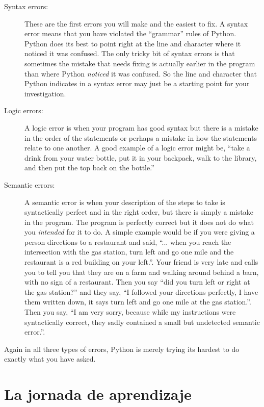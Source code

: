 \begin{description}

\item[Syntax errors:] These are the first errors you will make and the easiest
to fix.  A syntax error means that you have violated the ``grammar'' rules of Python.
Python does its best to point right at the line and character where 
it noticed it was confused.  The only tricky bit of syntax errors is that sometimes
the mistake that needs fixing is actually earlier in the program than where Python
{\em noticed} it was confused.  So the line and character that Python indicates in 
a syntax error may just be a starting point for your investigation.

\item[Logic errors:] A logic error is when your program has good syntax but there is a mistake 
in the order of the statements or perhaps a mistake in how the statements relate to one another.
A good example of a logic error might be, ``take a drink from your water bottle, put it 
in your backpack, walk to the library, and then put the top back on the bottle.''

\item[Semantic errors:] A semantic error is when your description of the steps to take 
is syntactically perfect and in the right order, but there is simply a mistake in 
the program.  The program is perfectly correct but it does not do what
you {\em intended} for it to do. A simple example would
be if you were giving a person directions to a restaurant and said, ``... when you reach
the intersection with the gas station, turn left and go one mile and the restaurant
is a red building on your left.''.  Your friend is very late and calls you to tell you that
they are on a farm and walking around behind a barn, with no sign of a restaurant.  
Then you say ``did you turn left or right at the gas station?'' and 
they say, ``I followed your directions perfectly, I have 
them written down, it says turn left and go one mile at the gas station.''.  Then you say,
``I am very sorry, because while my instructions were syntactically correct, they 
sadly contained a small but undetected semantic error.''. 

\end{description}

Again in all three types of errors, Python is merely trying its hardest to 
do exactly what you have asked.

\section{La jornada de aprendizaje}

